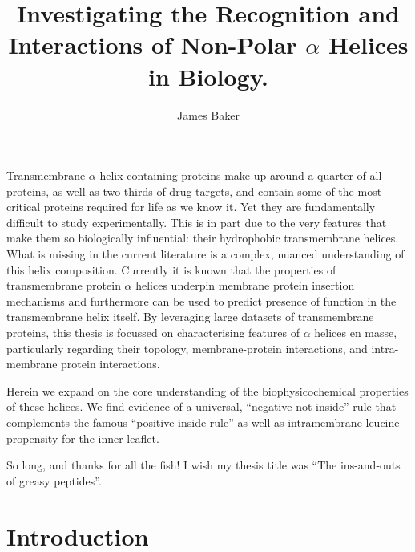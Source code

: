 \documentclass[12pt,PhD,twoside]{muthesis}
\begin{document}
\title{Investigating the Recognition and Interactions of Non-Polar $\alpha$ Helices in Biology.}
\author{James Baker}
\def\wordcount{xxxxx}

\tablespagefalse

\figurespagefalse


\beforeabstract

Transmembrane $\alpha$ helix containing proteins make up around a quarter of all proteins, as well as two thirds of drug targets, and contain some of the most critical proteins required for life as we know it. Yet they are fundamentally difficult to study experimentally. This is in part due to the very features that make them so biologically influential: their hydrophobic transmembrane helices. What is missing in the current literature is a complex, nuanced understanding of this helix composition. Currently it is known that the properties of transmembrane protein $\alpha$ helices underpin membrane protein insertion mechanisms and furthermore can be used to predict presence of function in the transmembrane helix itself. By leveraging large datasets of transmembrane proteins, this thesis is focussed on characterising features of $\alpha$ helices en masse, particularly regarding their topology, membrane-protein interactions, and intra-membrane protein interactions.

Herein we expand on the core understanding of the biophysicochemical properties of these helices. We find evidence of a universal, ``negative-not-inside'' rule that complements the famous ``positive-inside rule'' as well as intramembrane leucine propensity for the inner leaflet.

\afterabstract

So long, and thanks for all the fish! I wish my thesis title was ``The ins-and-outs of greasy peptides''.


\afterpreface %

\chapter{Introduction}
\end{document}
